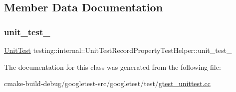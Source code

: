 \subsection{Member Data Documentation}
\mbox{\label{classtesting_1_1internal_1_1UnitTestRecordPropertyTestHelper_a415e13a354d3b8bd97db96aae5ef5df1}} 
\subsubsection{\texorpdfstring{unit\_test\_}{unit\_test\_}}
{\footnotesize\ttfamily \mbox{\hyperlink{classtesting_1_1UnitTest}{Unit\+Test}} testing\+::internal\+::\+Unit\+Test\+Record\+Property\+Test\+Helper\+::unit\+\_\+test\+\_\+\hspace{0.3cm}{\ttfamily [protected]}}



The documentation for this class was generated from the following file\+:\begin{DoxyCompactItemize}
\item 
cmake-\/build-\/debug/googletest-\/src/googletest/test/\mbox{\hyperlink{gtest__unittest_8cc}{gtest\+\_\+unittest.\+cc}}\end{DoxyCompactItemize}
